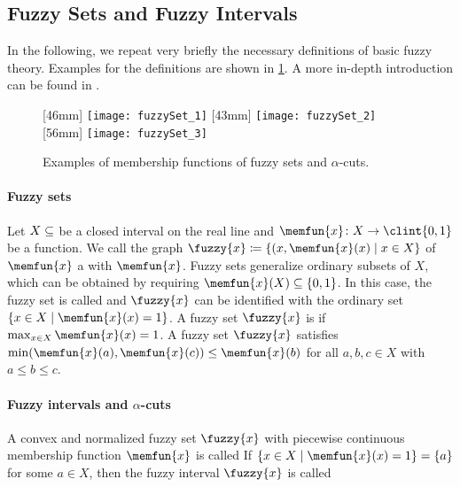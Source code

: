 \subsection{Fuzzy Sets and Fuzzy Intervals}
\label{sec:551fuzzySets}

In the following, we repeat very briefly the necessary
definitions of basic fuzzy theory.
Examples for the definitions are shown in \cref{fig:fuzzySet}.
A more in-depth introduction can be found in
.

\begin{figure}
  [46mm]{%
    \texttt{[image: fuzzySet\_1]}%
  }%
  \hfill%
  [43mm]{%
    \texttt{[image: fuzzySet\_2]}%
  }%
  \hfill%
  [56mm]{%
    \texttt{[image: fuzzySet\_3]}%
  }%
  \caption[%
    Examples of fuzzy sets and $\alpha$-cuts%
  ]{%
    Examples of membership functions of fuzzy sets and $\alpha$-cuts.%
  }%
  \label{fig:fuzzySet}%
\end{figure}

\paragraph{Fuzzy sets}

Let $X \subset \real$ be a closed interval on the real line
and $\memfun{x}\colon X \to \clint{0, 1}$ be a function.
We call the graph $\fuzzy{x} \ceq \{(x, \memfun{x}(x) \mid x \in X\}$
of $\memfun{x}$ a  with
 $\memfun{x}$.
Fuzzy sets generalize ordinary subsets of $X$,
which can be obtained by requiring $\memfun{x}(X) \subset \{0, 1\}$.
In this case, the fuzzy set is called  and
$\fuzzy{x}$ can be identified with the ordinary set
$\{x \in X \mid \memfun{x}(x) = 1\}$.
A fuzzy set $\fuzzy{x}$ is 
if $\max_{x \in X} \memfun{x}(x) = 1$.
A  fuzzy set $\fuzzy{x}$ satisfies
$\min(\memfun{x}(a), \memfun{x}(c)) \le \memfun{x}(b)$ for all $a, b, c \in X$
with $a \le b \le c$.

\paragraph{Fuzzy intervals and $\alpha$-cuts}

A convex and normalized fuzzy set $\fuzzy{x}$ with
piecewise continuous membership function $\memfun{x}$ is called
If $\{x \in X \mid \memfun{x}(x) = 1\} = \{a\}$ for some $a \in X$,
then the fuzzy interval $\fuzzy{x}$ is called 

